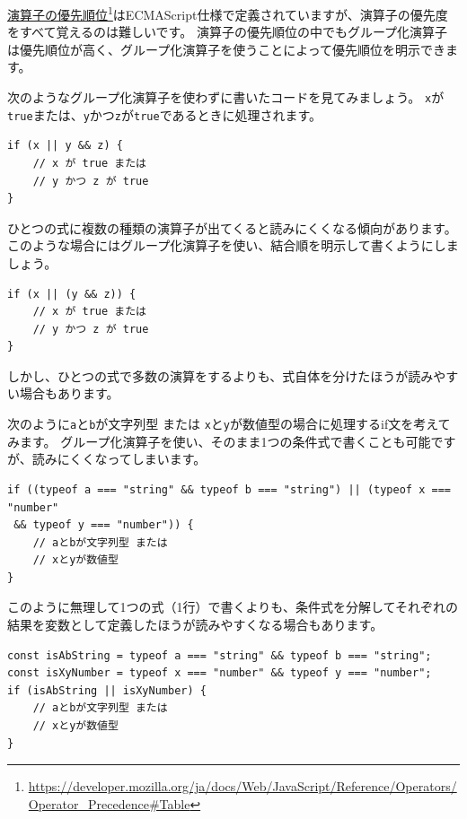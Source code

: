 \href{https://developer.mozilla.org/ja/docs/Web/JavaScript/Reference/Operators/Operator_Precedence\#Table}{演算子の優先順位}\footnote{\url{https://developer.mozilla.org/ja/docs/Web/JavaScript/Reference/Operators/Operator_Precedence\#Table}}はECMAScript仕様で定義されていますが、演算子の優先度をすべて覚えるのは難しいです。
演算子の優先順位の中でもグループ化演算子は優先順位が高く、グループ化演算子を使うことによって優先順位を明示できます。

次のようなグループ化演算子を使わずに書いたコードを見てみましょう。
\texttt{x}が\texttt{true}または、\texttt{y}かつ\texttt{z}が\texttt{true}であるときに処理されます。

\begin{lstlisting}
if (x || y && z) {
    // x が true または
    // y かつ z が true
}
\end{lstlisting}

ひとつの式に複数の種類の演算子が出てくると読みにくくなる傾向があります。
このような場合にはグループ化演算子を使い、結合順を明示して書くようにしましょう。

\begin{lstlisting}
if (x || (y && z)) {
    // x が true または
    // y かつ z が true
}
\end{lstlisting}

しかし、ひとつの式で多数の演算をするよりも、式自体を分けたほうが読みやすい場合もあります。

次のように\texttt{a}と\texttt{b}が文字列型
または
\texttt{x}と\texttt{y}が数値型の場合に処理するif文を考えてみます。
グループ化演算子を使い、そのまま1つの条件式で書くことも可能ですが、読みにくくなってしまいます。

\begin{lstlisting}
if ((typeof a === "string" && typeof b === "string") || (typeof x === "number"
 && typeof y === "number")) {
    // aとbが文字列型 または
    // xとyが数値型
}
\end{lstlisting}

このように無理して1つの式（1行）で書くよりも、条件式を分解してそれぞれの結果を変数として定義したほうが読みやすくなる場合もあります。

\begin{lstlisting}
const isAbString = typeof a === "string" && typeof b === "string";
const isXyNumber = typeof x === "number" && typeof y === "number";
if (isAbString || isXyNumber) {
    // aとbが文字列型 または
    // xとyが数値型
}
\end{lstlisting}

